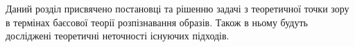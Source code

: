 Даний розділ присвячено постановці та рішенню задачі з теоретичної точки зору
в термінах баєсової теорії розпізнавання образів.
Також в ньому будуть досліджені теоретичні неточності існуючих підходів.
